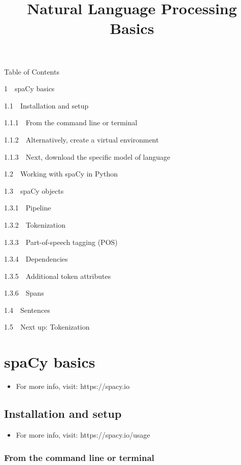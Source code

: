 \documentclass[11pt]{article}
\title{Natural Language Processing Basics}
\providecommand{\tightlist}{%
      \setlength{\itemsep}{0pt}\setlength{\parskip}{0pt}}
\begin{document}
    
    \maketitle
    
    

    
    Table of Contents{}

{{1~~}spaCy basics}

{{1.1~~}Installation and setup}

{{1.1.1~~}From the command line or terminal}

{{1.1.2~~}Alternatively, create a virtual environment}

{{1.1.3~~}Next, download the specific model of language}

{{1.2~~}Working with spaCy in Python}

{{1.3~~}spaCy objects}

{{1.3.1~~}Pipeline}

{{1.3.2~~}Tokenization}

{{1.3.3~~}Part-of-speech tagging (POS)}

{{1.3.4~~}Dependencies}

{{1.3.5~~}Additional token attributes}

{{1.3.6~~}Spans}

{{1.4~~}Sentences}

{{1.5~~}Next up: Tokenization}

    \hypertarget{spacy-basics}{%
\section{spaCy basics}\label{spacy-basics}}

\begin{itemize}
\tightlist
\item
  For more info, visit: https://spacy.io
\end{itemize}

    \hypertarget{installation-and-setup}{%
\subsection{Installation and setup}\label{installation-and-setup}}

\begin{itemize}
\tightlist
\item
  For more info, visit: https://spacy.io/usage
\end{itemize}

    \hypertarget{from-the-command-line-or-terminal}{%
\subsubsection{From the command line or
terminal}\label{from-the-command-line-or-terminal}}
\end{document}
